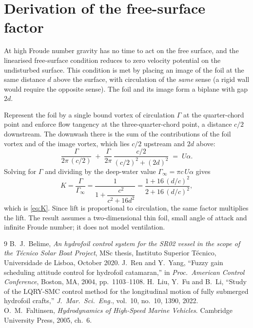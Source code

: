 \documentclass[11pt,a4paper]{article}
\begin{document}
\appendix
\section{Derivation of the free-surface factor}
\label{app:K}

At high Froude number gravity has no time to act on the free surface, and the
linearised free-surface condition reduces to zero velocity potential on the
undisturbed surface. This condition is met by placing an image of the foil at the
same distance $d$ above the surface, with circulation of the \emph{same} sense
(a rigid wall would require the opposite sense). The foil and its image form a
biplane with gap $2d$.

Represent the foil by a single bound vortex of circulation $\Gamma$ at the
quarter-chord point and enforce flow tangency at the three-quarter-chord point, a
distance $c/2$ downstream. The downwash there is the sum of the contributions of
the foil vortex and of the image vortex, which lies $c/2$ upstream and $2d$ above:
\[
\frac{\Gamma}{2\pi\,(c/2)} \;+\; \frac{\Gamma}{2\pi}\,
\frac{c/2}{(c/2)^2+(2d)^2} \;=\; U\alpha .
\]
Solving for $\Gamma$ and dividing by the deep-water value
$\Gamma_\infty=\pi c\,U\alpha$ gives
\[
K=\frac{\Gamma}{\Gamma_\infty}
 =\frac{1}{1+\dfrac{c^2}{c^2+16d^2}}
 =\frac{1+16\,(d/c)^2}{2+16\,(d/c)^2},
\]
which is \eqref{eq:K}. Since lift is proportional to circulation, the same factor
multiplies the lift. The result assumes a two-dimensional thin foil, small angle
of attack and infinite Froude number; it does not model ventilation.

\begin{thebibliography}{9}
 B.~J.~Belime, \emph{An hydrofoil control system for the SR02
vessel in the scope of the T\'ecnico Solar Boat Project}, MSc thesis, Instituto
Superior T\'ecnico, Universidade de Lisboa, October 2020.
 J.~Ren and Y.~Yang, ``Fuzzy gain scheduling attitude control
for hydrofoil catamaran,'' in \emph{Proc.\ American Control Conference}, Boston,
MA, 2004, pp.~1103--1108.
 H.~Liu, Y.~Fu and B.~Li, ``Study of the LQRY-SMC control method for
the longitudinal motion of fully submerged hydrofoil crafts,'' \emph{J.\ Mar.\
Sci.\ Eng.}, vol.~10, no.~10, 1390, 2022.
 O.~M.~Faltinsen, \emph{Hydrodynamics of High-Speed Marine
Vehicles}. Cambridge University Press, 2005, ch.~6.
\end{thebibliography}
\end{document}
